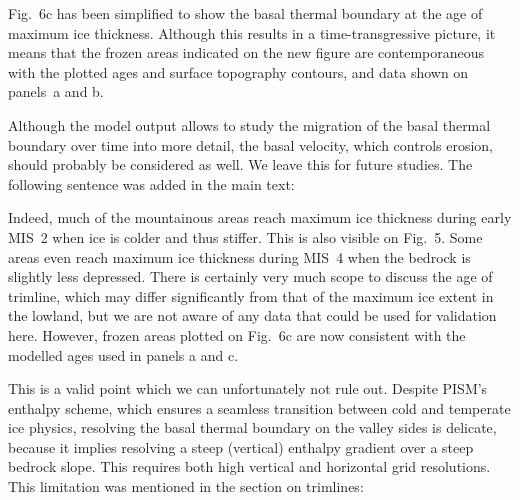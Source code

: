     Fig.~6c has been simplified to show the basal thermal boundary at the age
    of maximum ice thickness. Although this results in a time-transgressive
    picture, it means that the frozen areas indicated on the new figure are
    contemporaneous with the plotted ages and surface topography contours, and
    data shown on panels~a and b.

    Although the model output allows to study the migration of the basal
    thermal boundary over time into more detail, the basal velocity, which
    controls erosion, should probably be considered as well. We leave this for
    future studies. The following sentence was added in the main text:



    Indeed, much of the mountainous areas reach maximum ice thickness during
    early MIS~2 when ice is colder and thus stiffer. This is also visible on
    Fig.~5. Some areas even reach maximum ice thickness during MIS~4 when the
    bedrock is slightly less depressed. There is certainly very much scope to
    discuss the age of trimline, which may differ significantly from that of
    the maximum ice extent in the lowland, but we are not aware of any data
    that could be used for validation here. However, frozen areas plotted on
    Fig.~6c are now consistent with the modelled ages used in panels a and c.


    This is a valid point which we can unfortunately not rule out. Despite
    PISM's enthalpy scheme, which ensures a seamless transition between cold
    and temperate ice physics, resolving the basal thermal boundary on the
    valley sides is delicate, because it implies resolving a steep (vertical)
    enthalpy gradient over a steep bedrock slope. This requires both high
    vertical and horizontal grid resolutions. This limitation was mentioned
    in the section on trimlines:

